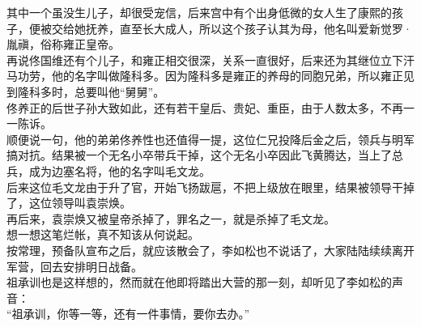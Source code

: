 \begin{multicols}{\theparacolNo}
其中一个虽没生儿子，却很受宠信，后来宫中有个出身低微的女人生了康熙的孩子，便被交给她抚养，直至长大成人，所以这个孩子认其为母，他名叫爱新觉罗·胤禛，俗称雍正皇帝。\\

再说佟国维还有个儿子，和雍正相交很深，关系一直很好，后来还为其继位立下汗马功劳，他的名字叫做隆科多。因为隆科多是雍正的养母的同胞兄弟，所以雍正见到隆科多时，总要叫他“舅舅”。\\

佟养正的后世子孙大致如此，还有若干皇后、贵妃、重臣，由于人数太多，不再一一陈诉。\\

顺便说一句，他的弟弟佟养性也还值得一提，这位仁兄投降后金之后，领兵与明军搞对抗。结果被一个无名小卒带兵干掉，这个无名小卒因此飞黄腾达，当上了总兵，成为边塞名将，他的名字叫毛文龙。\\

后来这位毛文龙由于升了官，开始飞扬跋扈，不把上级放在眼里，结果被领导干掉了，这位领导叫袁崇焕。\\

再后来，袁崇焕又被皇帝杀掉了，罪名之一，就是杀掉了毛文龙。\\

想一想这笔烂帐，真不知该从何说起。\\

按常理，预备队宣布之后，就应该散会了，李如松也不说话了，大家陆陆续续离开军营，回去安排明日战备。\\

祖承训也是这样想的，然而就在他即将踏出大营的那一刻，却听见了李如松的声音：\\

“祖承训，你等一等，还有一件事情，要你去办。”\\

\ifnum{}
	\end{multicols}
\fi
\newpage

